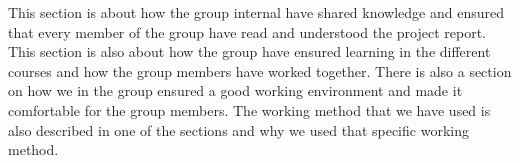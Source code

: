 This section is about how the group internal have shared knowledge and ensured that every member of the group have read and understood the project report. This section is also about how the group have ensured learning in the different courses and how the group members have worked together. There is also a section on how we in the group ensured a good working environment and made it comfortable for the group members. The working method that we have used is also described in one of the sections and why we used that specific working method.